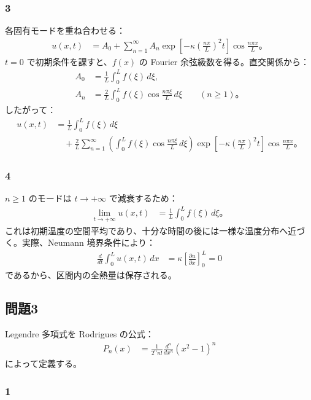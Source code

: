 \documentclass[platex,dvipdfmx,a4paper]{jsarticle}
\newcommand{\hb}[2]{\frac{\partial #1}{\partial #2}}
\newcommand{\bbn}[2]{\frac{d #1}{d #2}}
\newcommand{\nbbn}[3]{\frac{d^{#1} #2}{d #3^{#1}}}
\begin{document}
\subsubsection*{3}

各固有モードを重ね合わせる：
\begin{align*}
  u(x,t)
  &=A_0+\sum_{n=1}^{\infty}A_n
    \exp\left[-\kappa\left(\frac{n\pi}{L}\right)^2t\right]
    \cos\frac{n\pi x}{L}。
\end{align*}
$t=0$ で初期条件を課すと、$f(x)$ の Fourier 余弦級数を得る。直交関係から：
\begin{align*}
  A_0
  &=\frac{1}{L}\int_0^Lf(\xi)\,d\xi,\\
  A_n
  &=\frac{2}{L}\int_0^Lf(\xi)\cos\frac{n\pi\xi}{L}\,d\xi
  \qquad (n\geq1)。
\end{align*}
したがって：
\begin{align*}
  u(x,t)
  &=\frac{1}{L}\int_0^Lf(\xi)\,d\xi \\
  &\quad+\frac{2}{L}\sum_{n=1}^{\infty}
    \left(\int_0^Lf(\xi)\cos\frac{n\pi\xi}{L}\,d\xi\right)
    \exp\left[-\kappa\left(\frac{n\pi}{L}\right)^2t\right]
    \cos\frac{n\pi x}{L}。
\end{align*}

\subsubsection*{4}

$n\geq1$ のモードは $t\to+\infty$ で減衰するため：
\begin{align*}
  \lim_{t\to+\infty}u(x,t)
  &=\frac{1}{L}\int_0^Lf(\xi)\,d\xi。
\end{align*}
これは初期温度の空間平均であり、十分な時間の後には一様な温度分布へ近づく。実際、Neumann 境界条件により：
\begin{align*}
  \bbn{}{t}\int_0^Lu(x,t)\,dx
  &=\kappa\left[\hb{u}{x}\right]_0^L
   =0
\end{align*}
であるから、区間内の全熱量は保存される。

\subsection*{問題3}

Legendre 多項式を Rodrigues の公式：
\begin{align*}
  P_n(x)
  &=\frac{1}{2^nn!}\nbbn{n}{}{x}(x^2-1)^n
\end{align*}
によって定義する。

\subsubsection*{1}
\end{document}
